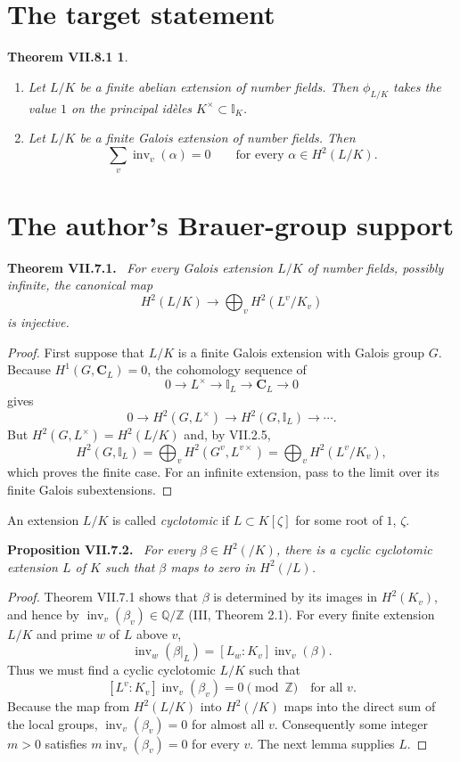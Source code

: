\documentclass[11pt]{article}
\newcommand{\I}{\mathbb I}
\newcommand{\C}{\mathbf C}
\newcommand{\Q}{\mathbb Q}
\newcommand{\Z}{\mathbb Z}
\newcommand{\inv}{\operatorname{inv}}
\newtheorem*{target}{Theorem VII.8.1}
\newenvironment{authorresult}[2]{\par\medskip\noindent\textbf{#1 VII.#2.}\ \itshape}{\par\medskip}
\begin{document}
\section*{The target statement}
\begin{target}
\begin{enumerate}
\item[(a)] Let $L/K$ be a finite abelian extension of number fields. Then
$\phi_{L/K}$ takes the value $1$ on the principal id\`eles
$K^\times\subset\I_K$.
\item[(b)] Let $L/K$ be a finite Galois extension of number fields. Then
\[
 \sum_v\inv_v(\alpha)=0\qquad\text{for every }\alpha\in H^2(L/K).
\]
\end{enumerate}
\end{target}

\section*{The author's Brauer-group support}
\begin{authorresult}{Theorem}{7.1}
For every Galois extension $L/K$ of number fields, possibly infinite, the
canonical map
\[
 H^2(L/K)\longrightarrow\bigoplus_v H^2(L^v/K_v)
\]
is injective.
\end{authorresult}
\begin{proof}
First suppose that $L/K$ is a finite Galois extension with Galois group $G$.
Because $H^1(G,\C_L)=0$, the cohomology sequence of
\[
 0\longrightarrow L^\times\longrightarrow\I_L\longrightarrow\C_L
 \longrightarrow0
\]
gives
\[
 0\longrightarrow H^2(G,L^\times)\longrightarrow H^2(G,\I_L)
 \longrightarrow\cdots.
\]
But $H^2(G,L^\times)=H^2(L/K)$ and, by VII.2.5,
\[
 H^2(G,\I_L)
 =\bigoplus_v H^2(G^v,L^{v\times})
 =\bigoplus_v H^2(L^v/K_v),
\]
which proves the finite case. For an infinite extension, pass to the limit
over its finite Galois subextensions.
\end{proof}

An extension $L/K$ is called \emph{cyclotomic} if $L\subset K[\zeta]$ for
some root of $1$, $\zeta$.
\begin{authorresult}{Proposition}{7.2}
For every $\beta\in H^2(/K)$, there is a cyclic cyclotomic extension $L$ of
$K$ such that $\beta$ maps to zero in $H^2(/L)$.
\end{authorresult}
\begin{proof}
Theorem VII.7.1 shows that $\beta$ is determined by its images in $H^2(K_v)$,
and hence by $\inv_v(\beta_v)\in\Q/\Z$ (III, Theorem 2.1).
For every finite extension $L/K$ and prime $w$ of $L$ above $v$,
\[
 \inv_w(\beta|_L)=[L_w:K_v]\inv_v(\beta).
\]
Thus we must find a cyclic cyclotomic $L/K$ such that
\[
 [L^v:K_v]\inv_v(\beta_v)=0\pmod{\Z}\quad\text{for all }v.
\]
Because the map from $H^2(L/K)$ into $H^2(/K)$ maps into the direct sum of
the local groups, $\inv_v(\beta_v)=0$ for almost all $v$.
Consequently some integer $m>0$ satisfies
$m\inv_v(\beta_v)=0$ for every $v$. The next lemma supplies $L$.
\end{proof}
\end{document}
